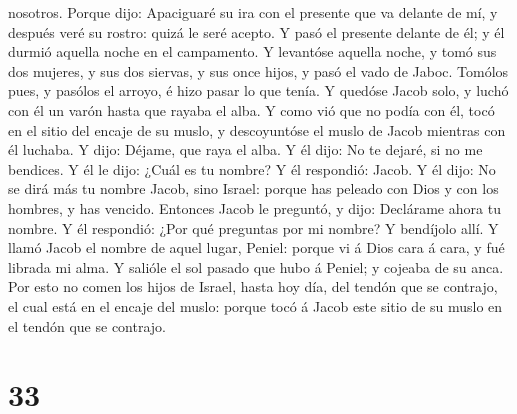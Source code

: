 nosotros. Porque dijo: Apaciguaré su ira con el presente que va delante
de mí, y después veré su rostro: quizá le seré acepto.  Y
pasó el presente delante de él; y él durmió aquella noche en el
campamento.  Y levantóse aquella noche, y tomó sus dos
mujeres, y sus dos siervas, y sus once hijos, y pasó el vado de Jaboc.
 Tomólos pues, y pasólos el arroyo, é hizo pasar lo que
tenía.  Y quedóse Jacob solo, y luchó con él un varón hasta
que rayaba el alba.  Y como vió que no podía con él, tocó
en el sitio del encaje de su muslo, y descoyuntóse el muslo de Jacob
mientras con él luchaba.  Y dijo: Déjame, que raya el alba.
Y él dijo: No te dejaré, si no me bendices.  Y él le dijo:
¿Cuál es tu nombre? Y él respondió: Jacob.  Y él dijo: No
se dirá más tu nombre Jacob, sino Israel: porque has peleado con Dios y
con los hombres, y has vencido.  Entonces Jacob le
preguntó, y dijo: Declárame ahora tu nombre. Y él respondió: ¿Por qué
preguntas por mi nombre? Y bendíjolo allí.  Y llamó Jacob
el nombre de aquel lugar, Peniel: porque vi á Dios cara á cara, y fué
librada mi alma.  Y salióle el sol pasado que hubo á
Peniel; y cojeaba de su anca.  Por esto no comen los hijos
de Israel, hasta hoy día, del tendón que se contrajo, el cual está en el
encaje del muslo: porque tocó á Jacob este sitio de su muslo en el
tendón que se contrajo.

\hypertarget{section-32}{%
\section{33}\label{section-32}}

